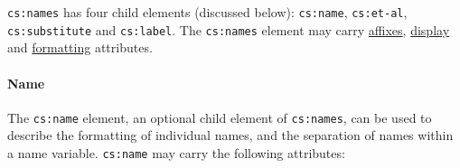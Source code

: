 \begin{Shaded}
\begin{Highlighting}[]
\NormalTok{\textless{}}\NormalTok{\textgreater{}}
\NormalTok{  \textless{}}\NormalTok{/\textgreater{}}
\NormalTok{\textless{}/}\NormalTok{\textgreater{}}
\end{Highlighting}
\end{Shaded}

\texttt{cs:names} has four child elements (discussed below):
\texttt{cs:name}, \texttt{cs:et-al}, \texttt{cs:substitute} and
\texttt{cs:label}. The \texttt{cs:names} element may carry
\protect\hyperlink{affixes}{affixes},
\protect\hyperlink{display}{display} and
\protect\hyperlink{formatting}{formatting} attributes.

\hypertarget{name}{%
\paragraph{Name}\label{name}}

The \texttt{cs:name} element, an optional child element of
\texttt{cs:names}, can be used to describe the formatting of individual
names, and the separation of names within a name variable.
\texttt{cs:name} may carry the following attributes:

